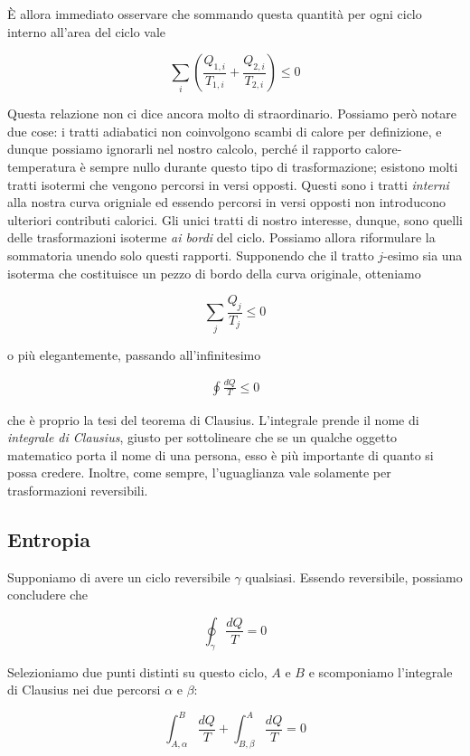 \noindent È allora immediato osservare che sommando questa quantità
per ogni ciclo interno all'area del ciclo vale

\[ \sum_{i} \left(\frac{Q_{1,i}}{T_{1,i}} + \frac{Q_{2,i}}{T_{2,i}}\right) \leq 0\]

\noindent Questa relazione non ci dice ancora molto di straordinario.
Possiamo però notare due cose: i tratti adiabatici non coinvolgono
scambi di calore per definizione, e dunque possiamo ignorarli nel
nostro calcolo, perché il rapporto calore-temperatura è sempre nullo
durante questo tipo di trasformazione; esistono molti tratti isotermi
che vengono percorsi in versi opposti. Questi sono i tratti \textit{interni}
alla nostra curva origniale ed essendo percorsi in versi opposti non
introducono ulteriori contributi calorici. Gli unici tratti di nostro
interesse, dunque, sono quelli delle trasformazioni isoterme \textit{ai
bordi} del ciclo. Possiamo allora riformulare la sommatoria unendo
solo questi rapporti. Supponendo che il tratto $j$-esimo sia una isoterma
che costituisce un pezzo di bordo della curva originale, otteniamo

\[ \sum_{j} \frac{Q_j}{T_j} \leq 0 \]

\noindent o più elegantemente, passando all'infinitesimo

\begin{align}
    \oint \frac{dQ}{T} \leq 0
\end{align}

\noindent che è proprio la tesi del teorema di Clausius. L'integrale
prende il nome di \textit{integrale di Clausius}, giusto per sottolineare
che se un qualche oggetto matematico porta il nome di una persona, esso è più
importante di quanto si possa credere. Inoltre, come sempre, l'uguaglianza
vale solamente per trasformazioni reversibili.

\subsection*{Entropia}
Supponiamo di avere un ciclo reversibile $\gamma$ qualsiasi. Essendo
reversibile, possiamo concludere che

\[ \oint_\gamma \frac{dQ}{T} = 0 \]

\noindent Selezioniamo due punti distinti su questo ciclo, $A$ e $B$
e scomponiamo l'integrale di Clausius nei due percorsi $\alpha$ e
$\beta$:

\[ \int_{A,\alpha}^{B} \frac{dQ}{T} + \int_{B,\beta}^{A} \frac{dQ}{T} = 0 \]

